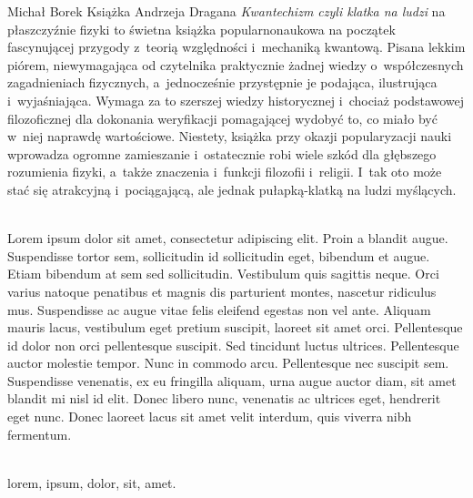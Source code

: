 \begin{newrevplenv}{Michał Borek}
Książka Andrzeja Dragana \textit{Kwantechizm czyli klatka na ludzi} na płaszczyźnie fizyki to świetna książka popularnonaukowa na początek fascynującej przygody z~teorią względności i~mechaniką kwantową. Pisana lekkim piórem, niewymagająca od czytelnika praktycznie żadnej wiedzy o~współczesnych zagadnieniach fizycznych, a~jednocześnie przystępnie je podająca, ilustrująca i~wyjaśniająca. Wymaga za to szerszej wiedzy historycznej i~chociaż podstawowej filozoficznej dla dokonania weryfikacji pomagającej wydobyć to, co miało być w~niej naprawdę wartościowe. Niestety, książka przy okazji popularyzacji nauki wprowadza ogromne zamieszanie i~ostatecznie robi wiele szkód dla głębszego rozumienia fizyki, a~także znaczenia i~funkcji filozofii i~religii. I~tak oto może stać się atrakcyjną i~pociągającą, ale jednak pułapką-klatką na ludzi myślących.





\vspace{5mm}%
\begin{flushright}
{\chaptitleeng\color{black!50}{A cage for thinking people}}
\end{flushright}

{}\\
{Lorem ipsum dolor sit amet, consectetur adipiscing elit. Proin a blandit augue. Suspendisse tortor sem, sollicitudin id sollicitudin eget, bibendum et augue. Etiam bibendum at sem sed sollicitudin. Vestibulum quis sagittis neque. Orci varius natoque penatibus et magnis dis parturient montes, nascetur ridiculus mus. Suspendisse ac augue vitae felis eleifend egestas non vel ante. Aliquam mauris lacus, vestibulum eget pretium suscipit, laoreet sit amet orci. Pellentesque id dolor non orci pellentesque suscipit. Sed tincidunt luctus ultrices. Pellentesque auctor molestie tempor. Nunc in commodo arcu. Pellentesque nec suscipit sem. Suspendisse venenatis, ex eu fringilla aliquam, urna augue auctor diam, sit amet blandit mi nisl id elit. Donec libero nunc, venenatis ac ultrices eget, hendrerit eget nunc. Donec laoreet lacus sit amet velit interdum, quis viverra nibh fermentum.}\par%
\vspace{2mm}%
{}\\%
{lorem, ipsum, dolor, sit, amet.}%


\end{newrevplenv}
